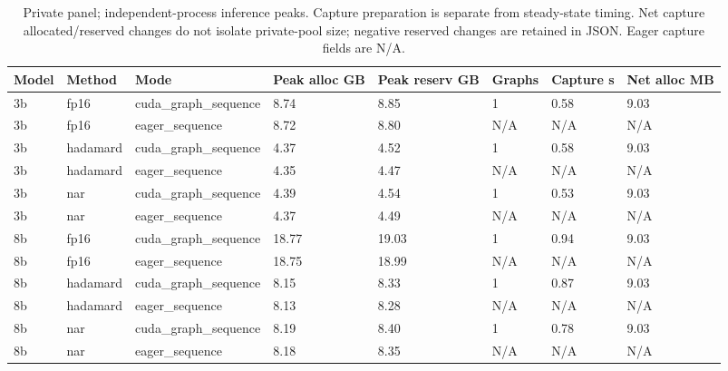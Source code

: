 \begin{table}[t]
\centering
\small
\caption{Private panel; independent-process inference peaks. Capture preparation is separate from steady-state timing. Net capture allocated/reserved changes do not isolate private-pool size; negative reserved changes are retained in JSON. Eager capture fields are N/A.}
\begin{tabular}{llllllll}
\toprule
Model & Method & Mode & Peak alloc GB & Peak reserv GB & Graphs & Capture s & Net alloc MB \\
\midrule
3b & fp16 & cuda\_graph\_sequence & 8.74 & 8.85 & 1 & 0.58 & 9.03 \\
3b & fp16 & eager\_sequence & 8.72 & 8.80 & N/A & N/A & N/A \\
3b & hadamard & cuda\_graph\_sequence & 4.37 & 4.52 & 1 & 0.58 & 9.03 \\
3b & hadamard & eager\_sequence & 4.35 & 4.47 & N/A & N/A & N/A \\
3b & nar & cuda\_graph\_sequence & 4.39 & 4.54 & 1 & 0.53 & 9.03 \\
3b & nar & eager\_sequence & 4.37 & 4.49 & N/A & N/A & N/A \\
8b & fp16 & cuda\_graph\_sequence & 18.77 & 19.03 & 1 & 0.94 & 9.03 \\
8b & fp16 & eager\_sequence & 18.75 & 18.99 & N/A & N/A & N/A \\
8b & hadamard & cuda\_graph\_sequence & 8.15 & 8.33 & 1 & 0.87 & 9.03 \\
8b & hadamard & eager\_sequence & 8.13 & 8.28 & N/A & N/A & N/A \\
8b & nar & cuda\_graph\_sequence & 8.19 & 8.40 & 1 & 0.78 & 9.03 \\
8b & nar & eager\_sequence & 8.18 & 8.35 & N/A & N/A & N/A \\
\bottomrule
\end{tabular}
\end{table}
